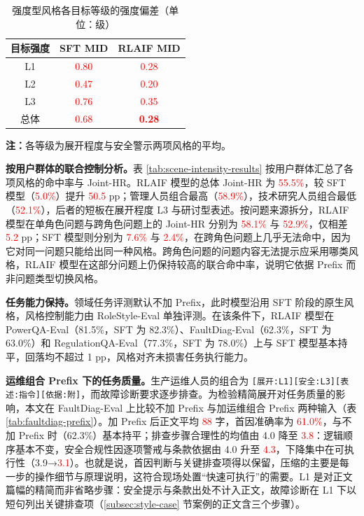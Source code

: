 \documentclass[fontset=fandol,type=master,campus=shenzhen,etitleauto=true]{hithesisbook}
\newcommand{\rev}[1]{\textcolor{red}{#1}}
\begin{document}
\begin{table}[htbp]
\centering
\caption{强度型风格各目标等级的强度偏差（单位：级）}
\label{tab:intensity-mid}
\small
\renewcommand{\arraystretch}{1.15}
\begin{tabular}{c c c}
\toprule
\textbf{目标强度} & \textbf{SFT MID} & \textbf{RLAIF MID} \\
\midrule
L1 & \rev{0.80} & \rev{0.28} \\
L2 & \rev{0.47} & \rev{0.20} \\
L3 & \rev{0.76} & \rev{0.35} \\
\midrule
总体 & \rev{0.68} & \rev{\textbf{0.28}} \\
\bottomrule
\end{tabular}

\vspace{0.2cm}
\parbox{\linewidth}{\small \textbf{注：}各等级为展开程度与安全警示两项风格的平均。}
\end{table}

\textbf{按用户群体的联合控制分析。}表 \ref{tab:scene-intensity-results} 按用户群体汇总了各项风格的命中率与 Joint-HR。RLAIF 模型的总体 Joint-HR 为 \rev{55.5\%}，较 SFT 模型（\rev{5.0\%}）提升 \rev{50.5} pp；管理人员组合最高（\rev{58.9\%}），技术研究人员组合最低（\rev{52.1\%}），后者的短板在展开程度 L3 与研讨型表述。按问题来源拆分，RLAIF 模型在单角色问题与跨角色问题上的 Joint-HR 分别为 \rev{58.1\%} 与 \rev{52.9\%}，仅相差 \rev{5.2} pp；SFT 模型则分别为 \rev{7.6\%} 与 \rev{2.4\%}，在跨角色问题上几乎无法命中，因为它对同一问题只能给出同一种风格。跨角色问题的问题内容无法提示应采用哪类风格，RLAIF 模型在这部分问题上仍保持较高的联合命中率，说明它依据 Prefix 而非问题类型切换风格。

\textbf{任务能力保持。}领域任务评测默认不加 Prefix，此时模型沿用 SFT 阶段的原生风格，风格控制能力由 RoleStyle-Eval 单独评测。在该条件下，RLAIF 模型在 PowerQA-Eval（81.5\%，SFT 为 82.3\%）、FaultDiag-Eval（62.3\%，SFT 为 63.0\%）和 RegulationQA-Eval（77.3\%，SFT 为 78.0\%）上与 SFT 模型基本持平，回落均不超过 1 pp，风格对齐未损害任务执行能力。

\textbf{运维组合 Prefix 下的任务质量。}生产运维人员的组合为 \texttt{[展开:L1][安全:L3][表述:指令][依据:附]}，而故障诊断要求逐步排查。为检验精简展开对任务质量的影响，本文在 FaultDiag-Eval 上比较不加 Prefix 与加运维组合 Prefix 两种输入（表 \ref{tab:faultdiag-prefix}）。加 Prefix 后正文平均 \rev{88} 字，首因准确率为 \rev{61.0\%}，与不加 Prefix 时（62.3\%）基本持平；排查步骤合理性的均值由 4.0 降至 \rev{3.8}：逻辑顺序基本不变，安全合规性因逐项警戒与条款依据由 4.0 升至 \rev{4.3}，下降集中在可执行性（3.9→\rev{3.1}）。也就是说，首因判断与关键排查项得以保留，压缩的主要是每一步的操作细节与原理说明，这符合现场处置“快速可执行”的需要。L1 是对正文篇幅的精简而非省略步骤：安全提示与条款出处不计入正文，故障诊断在 L1 下以短句列出关键排查项（\ref{subsec:style-case} 节案例的正文含三个步骤）。
\end{document}
